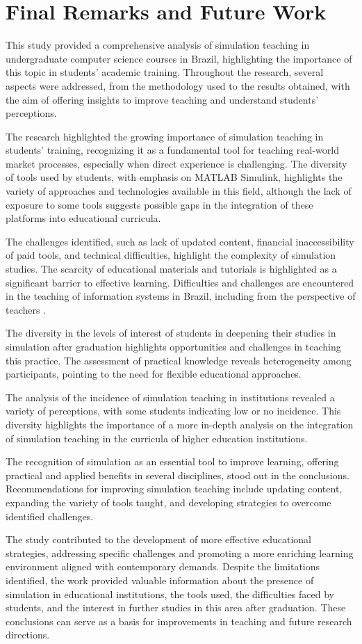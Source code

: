 \section{Final Remarks and Future Work} 
\label{sec:FR}
This study provided a comprehensive analysis of simulation teaching in undergraduate computer science courses in Brazil, highlighting the importance of this topic in students’ academic training. Throughout the research, several aspects were addressed, from the methodology used to the results obtained, with the aim of offering insights to improve teaching and understand students’ perceptions.

The research highlighted the growing importance of simulation teaching in students’ training, recognizing it as a fundamental tool for teaching real-world market processes, especially when direct experience is challenging. The diversity of tools used by students, with emphasis on MATLAB Simulink, highlights the variety of approaches and technologies available in this field, although the lack of exposure to some tools suggests possible gaps in the integration of these platforms into educational curricula.

The challenges identified, such as lack of updated content, financial inaccessibility of paid tools, and technical difficulties, highlight the complexity of simulation studies. The scarcity of educational materials and tutorials is highlighted as a significant barrier to effective learning. Difficulties and challenges are encountered in the teaching of information systems in Brazil, including from the perspective of teachers \cite{Neves2023}.

The diversity in the levels of interest of students in deepening their studies in simulation after graduation highlights opportunities and challenges in teaching this practice. The assessment of practical knowledge reveals heterogeneity among participants, pointing to the need for flexible educational approaches.

The analysis of the incidence of simulation teaching in institutions revealed a variety of perceptions, with some students indicating low or no incidence. This diversity highlights the importance of a more in-depth analysis on the integration of simulation teaching in the curricula of higher education institutions.

The recognition of simulation as an essential tool to improve learning, offering practical and applied benefits in several disciplines, stood out in the conclusions. Recommendations for improving simulation teaching include updating content, expanding the variety of tools taught, and developing strategies to overcome identified challenges.

The study contributed to the development of more effective educational strategies, addressing specific challenges and promoting a more enriching learning environment aligned with contemporary demands. Despite the limitations identified, the work provided valuable information about the presence of simulation in educational institutions, the tools used, the difficulties faced by students, and the interest in further studies in this area after graduation. These conclusions can serve as a basis for improvements in teaching and future research directions.